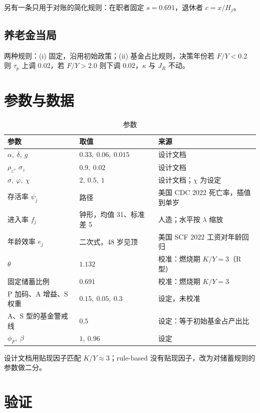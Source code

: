 \documentclass[UTF8,11pt,a4paper]{ctexart}
\begin{document}
另有一条只用于对账的简化规则：在职者固定 $s=0.691$，退休者 $c=x/H_j$。

\subsection{养老金当局}

两种规则：(i) 固定，沿用初始政策；(ii) 基金占比规则，决策年份若 $F/Y<0.2$ 则 $\tau_p$ 上调 $0.02$，若 $F/Y>2.0$ 则下调 $0.02$，$\kappa$ 与 $J_R$ 不动。

\section{参数与数据}

\begin{table}[H]
\centering\small
\caption{参数}\label{tab:params}
\begin{tabular}{lll}
\toprule
参数 & 取值 & 来源 \\
\midrule
$\alpha,\ \delta,\ g$ & $0.33,\ 0.06,\ 0.015$ & 设计文档 \\
$\rho_z,\ \sigma_z$ & $0.9,\ 0.02$ & 设计文档 \\
$\sigma,\ \varphi,\ \chi$ & $2,\ 0.5,\ 1$ & 设计文档；$\chi$ 为设定 \\
存活率 $\psi_j$ & 路径 & 美国 CDC 2022 死亡率，插值到单岁 \\
进入率 $f_j$ & 钟形，均值 31、标准差 5 & 人造；水平按 $\lambda$ 缩放 \\
年龄效率 $e_j$ & 二次式，48 岁见顶 & 美国 SCF 2022 工资对年龄回归 \\
$\theta$ & $1.132$ & 校准：燃烧期 $K/Y=3$（R 型）\\
固定储蓄比例 & $0.691$ & 校准：燃烧期 $K/Y=3$ \\
P 加码、A 增益、S 权重 & $0.15,\ 0.05,\ 0.3$ & 设定，未校准 \\
A、S 型的基金警戒线 & $0.5$ & 设定：等于初始基金占产出比 \\
$\phi_F,\ \beta$ & $1,\ 0.96$ & 设定 \\
\bottomrule
\end{tabular}
\end{table}

设计文档用贴现因子匹配 $K/Y\approx 3$；rule-based 没有贴现因子，改为对储蓄规则的参数做二分。

\section{验证}
\end{document}
